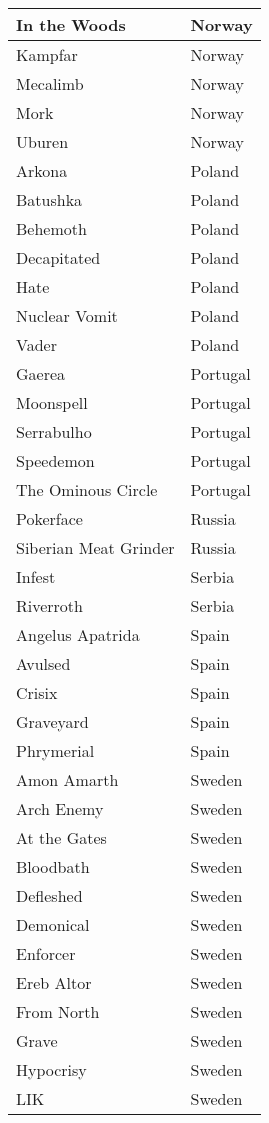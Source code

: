 \documentclass[12pt, a4paper, twoside]{report}
\begin{document}
\begin{center}
\begin{longtable}{|p{5cm}|p{5cm}|}
In the Woods & Norway \\ \hline
Kampfar & Norway \\ \hline
Mecalimb & Norway \\ \hline
Mork & Norway \\ \hline
Uburen & Norway \\ \hline
Arkona & Poland \\ \hline
Batushka & Poland \\ \hline
Behemoth & Poland \\ \hline
Decapitated & Poland \\ \hline
Hate & Poland \\ \hline
Nuclear Vomit & Poland \\ \hline
Vader & Poland \\ \hline
Gaerea & Portugal \\ \hline
Moonspell & Portugal \\ \hline
Serrabulho & Portugal \\ \hline
Speedemon & Portugal \\ \hline
The Ominous Circle & Portugal \\ \hline
Pokerface & Russia \\ \hline
Siberian Meat Grinder & Russia \\ \hline
Infest & Serbia \\ \hline
Riverroth & Serbia \\ \hline
Angelus Apatrida & Spain \\ \hline
Avulsed & Spain \\ \hline
Crisix & Spain \\ \hline
Graveyard & Spain \\ \hline
Phrymerial & Spain \\ \hline
Amon Amarth & Sweden \\ \hline
Arch Enemy & Sweden \\ \hline
At the Gates & Sweden \\ \hline
Bloodbath & Sweden \\ \hline
Defleshed & Sweden \\ \hline
Demonical & Sweden \\ \hline
Enforcer & Sweden \\ \hline
Ereb Altor & Sweden \\ \hline
From North & Sweden \\ \hline
Grave & Sweden \\ \hline
Hypocrisy & Sweden \\ \hline
LIK & Sweden \\ \hline

\end{longtable}
\end{center}
\end{document}
